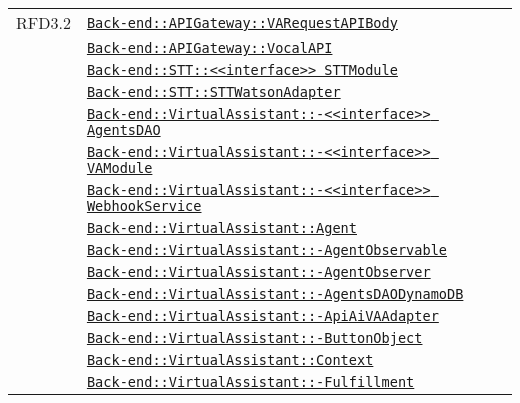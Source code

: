 \begin{longtable}{|>{\centering}m{3cm}|m{10cm}<{\centering}|}
RFD3.2 & \hyperref[Back-end::APIGateway::VARequestAPIBody]{\texttt{Back-end::APIGateway::VARequestAPIBody}}\\
& \hyperref[Back-end::APIGateway::VocalAPI]{\texttt{Back-end::APIGateway::VocalAPI}}\\
& \hyperref[Back-end::STT::<<interface>> STTModule]{\texttt{Back-end::STT::<<interface>> STTModule}}\\
& \hyperref[Back-end::STT::STTWatsonAdapter]{\texttt{Back-end::STT::STTWatsonAdapter}}\\
& \hyperref[Back-end::VirtualAssistant::<<interface>> AgentsDAO]{\texttt{Back-end::VirtualAssistant::-\linebreak <<interface>> AgentsDAO}}\\
& \hyperref[Back-end::VirtualAssistant::<<interface>> VAModule]{\texttt{Back-end::VirtualAssistant::-\linebreak <<interface>> VAModule}}\\
& \hyperref[Back-end::VirtualAssistant::<<interface>> WebhookService]{\texttt{Back-end::VirtualAssistant::-\linebreak <<interface>> WebhookService}}\\
& \hyperref[Back-end::VirtualAssistant::Agent]{\texttt{Back-end::VirtualAssistant::Agent}}\\
& \hyperref[Back-end::VirtualAssistant::AgentObservable]{\texttt{Back-end::VirtualAssistant::-\linebreak AgentObservable}}\\
& \hyperref[Back-end::VirtualAssistant::AgentObserver]{\texttt{Back-end::VirtualAssistant::-\linebreak AgentObserver}}\\
& \hyperref[Back-end::VirtualAssistant::AgentsDAODynamoDB]{\texttt{Back-end::VirtualAssistant::-\linebreak AgentsDAODynamoDB}}\\
& \hyperref[Back-end::VirtualAssistant::ApiAiVAAdapter]{\texttt{Back-end::VirtualAssistant::-\linebreak ApiAiVAAdapter}}\\
& \hyperref[Back-end::VirtualAssistant::ButtonObject]{\texttt{Back-end::VirtualAssistant::-\linebreak ButtonObject}}\\
& \hyperref[Back-end::VirtualAssistant::Context]{\texttt{Back-end::VirtualAssistant::Context}}\\
& \hyperref[Back-end::VirtualAssistant::Fulfillment]{\texttt{Back-end::VirtualAssistant::-\linebreak Fulfillment}}\\

\end{longtable}
